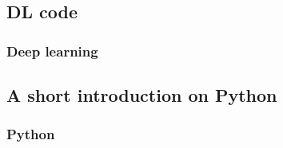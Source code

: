 \subsection{DL code}

\begin{frame}
  \MyLogo
  \frametitle{Deep learning}  

\end{frame}

\subsection{A short introduction on Python}

\begin{frame}
  \MyLogo
  \frametitle{Python}  

\end{frame}